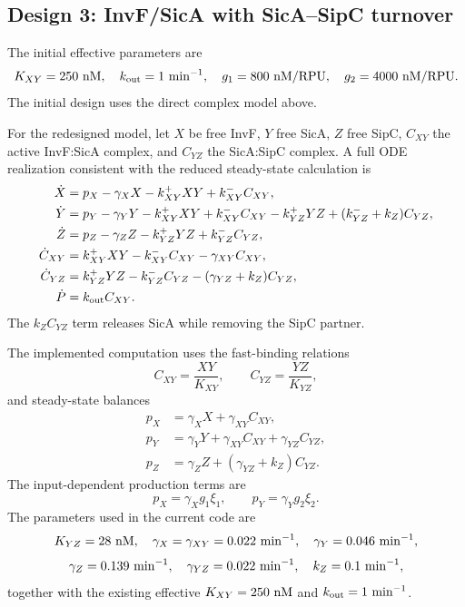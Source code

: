 \subsection{Design 3: InvF/SicA with SicA--SipC turnover}

The initial effective parameters are
\[
K_{XY}=250~{\rm nM},\quad k_{\rm out}=1~{\rm min}^{-1},\quad
g_1=800~{\rm nM/RPU},\quad g_2=4000~{\rm nM/RPU}.
\]
The initial design uses the direct complex model above.

For the redesigned model, let $X$ be free InvF, $Y$ free SicA, $Z$ free
SipC, $C_{XY}$ the active InvF:SicA complex, and $C_{YZ}$ the SicA:SipC
complex. A full ODE realization consistent with the reduced steady-state
calculation is
\begin{align}
\dot X&=p_X-\gamma_XX-k_{XY}^+XY+k_{XY}^-C_{XY},\\
\dot Y&=p_Y-\gamma_YY-k_{XY}^+XY+k_{XY}^-C_{XY}
-k_{YZ}^+YZ+(k_{YZ}^-+k_Z)C_{YZ},\\
\dot Z&=p_Z-\gamma_ZZ-k_{YZ}^+YZ+k_{YZ}^-C_{YZ},\\
\dot C_{XY}&=k_{XY}^+XY-k_{XY}^-C_{XY}-\gamma_{XY}C_{XY},\\
\dot C_{YZ}&=k_{YZ}^+YZ-k_{YZ}^-C_{YZ}
-(\gamma_{YZ}+k_Z)C_{YZ},\\
\dot P&=k_{\rm out}C_{XY}.
\end{align}
The $k_ZC_{YZ}$ term releases SicA while removing the SipC partner.

The implemented computation uses the fast-binding relations
\[
C_{XY}=\frac{XY}{K_{XY}},\qquad
C_{YZ}=\frac{YZ}{K_{YZ}},
\]
and steady-state balances
\begin{align}
p_X&=\gamma_XX+\gamma_{XY}C_{XY},\\
p_Y&=\gamma_YY+\gamma_{XY}C_{XY}+\gamma_{YZ}C_{YZ},\\
p_Z&=\gamma_ZZ+(\gamma_{YZ}+k_Z)C_{YZ}.
\end{align}
The input-dependent production terms are
\[
p_X=\gamma_Xg_1\xi_1,\qquad
p_Y=\gamma_Yg_2\xi_2.
\]
The parameters used in the current code are
\[
K_{YZ}=28~{\rm nM},\quad
\gamma_X=\gamma_{XY}=0.022~{\rm min}^{-1},\quad
\gamma_Y=0.046~{\rm min}^{-1},
\]
\[
\gamma_Z=0.139~{\rm min}^{-1},\quad
\gamma_{YZ}=0.022~{\rm min}^{-1},\quad
k_Z=0.1~{\rm min}^{-1},
\]
together with the existing effective $K_{XY}=250~{\rm nM}$ and
$k_{\rm out}=1~{\rm min}^{-1}$.

